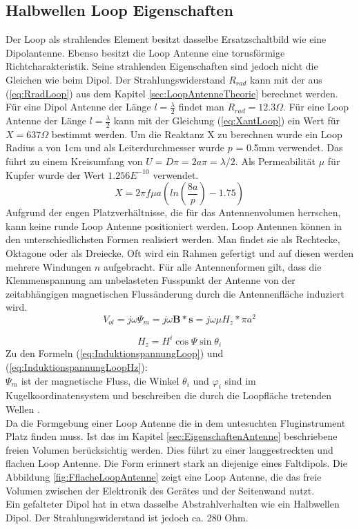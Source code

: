 \subsection{Halbwellen Loop Eigenschaften}
Der Loop als strahlendes Element besitzt dasselbe Ersatzschaltbild wie eine Dipolantenne. Ebenso besitzt die Loop Antenne eine torusförmige Richtcharakteristik. Seine strahlenden Eigenschaften sind jedoch nicht die Gleichen wie beim Dipol. Der Strahlungswiderstand $R_{rad}$ kann mit der aus  (\ref{eq:RradLoop}) aus dem  Kapitel \ref{sec:LoopAntenneTheorie} berechnet werden. Für eine Dipol Antenne der Länge $l=\frac{\lambda}{2}$ findet man $R_{rad} = 12.3\Omega$. Für eine Loop Antenne der Länge $l=\frac{\lambda}{2}$ kann mit der Gleichung (\ref{eq:XantLoop}) ein Wert für $X = 637 \Omega$ bestimmt werden. Um die Reaktanz X zu berechnen wurde ein Loop Radius a von 1cm und als Leiterdurchmesser wurde $p$ = 0.5mm  verwendet. Das führt zu einem Kreisumfang von $U=D\pi=2a\pi=\lambda /2$. Als Permeabilität $\mu $ für Kupfer wurde der Wert $1.256E^{-10}$ verwendet.
\begin{equation}\label{eq:XantLoop}
X= 2\pi f\mu a(ln \left( \frac{8a}{p} \right) - 1.75)
\end{equation}
Aufgrund der engen Platzverhältnisse, die für das Antennenvolumen herrschen, kann keine runde Loop Antenne positioniert werden. Loop Antennen können in den unterschiedlichsten Formen realisiert werden. Man findet sie als Rechtecke, Oktagone oder als Dreiecke. Oft wird ein Rahmen gefertigt und auf diesen  werden mehrere Windungen $n$ aufgebracht. Für alle Antennenformen gilt, dass die Klemmenspannung am unbelasteten Fusspunkt der Antenne von der zeitabhängigen magnetischen Flussänderung durch die Antennenfläche induziert wird.
\begin{equation}\label{eq:InduktionspannungLoop}
V_{ol}= j\omega\Psi_{m}=j\omega\textbf{B}*\textbf{s}= j\omega\mu H_{z}*\pi a^{2}
\end{equation}

\begin{equation}\label{eq:InduktionspannungLoopHz}
H_{z}=H^{i}\cos\Psi\sin\theta_{i}
\end{equation}
Zu den Formeln (\ref{eq:InduktionspannungLoop}) und (\ref{eq:InduktionspannungLoopHz}): \\
$\Psi_{m}$ ist der magnetische Fluss, die Winkel $\theta_{i}$ und $\varphi_{i}$  sind   im Kugelkoordinatensystem und beschreiben die durch die Loopfläche tretenden Wellen .\\ 
Da die Formgebung einer Loop Antenne die in dem untesuchten Fluginstrument Platz finden muss. Ist das im Kapitel \ref{sec:EigenschaftenAntenne} beschriebene freien Volumen berücksichtig werden. Dies führt zu einer langgestreckten und flachen Loop Antenne. Die Form erinnert stark an diejenige eines Faltdipols. Die Abbildung \ref{fig:FflacheLoopAntenne} zeigt eine Loop Antenne, die das freie Volumen zwischen der Elektronik des Gerätes und der Seitenwand nutzt.\\
Ein gefalteter Dipol hat in etwa dasselbe Abstrahlverhalten wie ein Halbwellen Dipol. Der Strahlungswiderstand ist jedoch  ca.  280 Ohm. 

